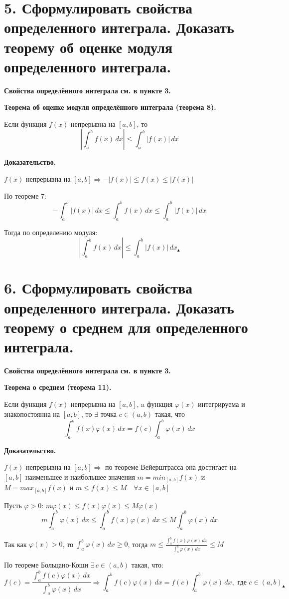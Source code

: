 \documentclass[11pt]{article}
\begin{document}
\section*{5. Сформулировать свойства определенного интеграла. Доказать теорему об оценке модуля определенного интеграла.}
\par\textbf{Свойства определённого интеграла см. в пункте 3.}
\par\textbf{Теорема об оценке модуля определённого интеграла (теорема 8).}
\par Если функция $f(x)$ непрерывна на $[a, b]$, то $$\left| \int_{a}^b f(x) \, dx \right| \leq \int_{a}^b |f(x)| \, dx$$
\par\textbf{Доказательство.}
\par $f(x)$ непрерывна на $[a, b] \Rightarrow -|f(x)| \leq f(x) \leq |f(x)|$
\par По теореме 7: $$- \int_{a}^b |f(x)| \, dx \leq \int_{a}^b f(x) \, dx \leq \int_{a}^b |f(x)| \, dx$$
\par Тогда по определению модуля: $$\left| \int_{a}^b f(x) \, dx \right| \leq \int_{a}^b |f(x)| \, dx _{\blacktriangle}$$

\section*{6. Сформулировать свойства определенного интеграла. Доказать теорему о среднем для определенного интеграла.}
\par\textbf{Свойства определённого интеграла см. в пункте 3.}
\par\textbf{Теорема о среднем (теорема 11).}
\par Если функция $f(x)$ непрерывна на $[a, b]$, a функция $\varphi(x)$ интегрируема и знакопостоянна на $[a, b]$, то $\exists$ точка $c \in (a, b)$ такая, что $$\int_{a}^b f(x)\varphi(x) \, dx = f(c) \int_{a}^b \varphi(x) \, dx$$
\par\textbf{Доказательство.}
\par $f(x)$ непрерывна на $[a, b] \Rightarrow$ по теореме Вейерштрасса она достигает на  $[a, b]$ наименьшее и наибольшее значения $m = min_{[a, b]} f(x)$ и $M = max_{[a, b]} f(x)$ и $m \leq f(x) \leq M \quad \forall x \in [a, b]$
\par Пусть $\varphi > 0$:
$m \varphi(x) \leq f(x) \varphi(x) \leq M \varphi(x)$
$$m \int_{a}^b \varphi(x) \, dx  \leq \int_{a}^b f(x) \varphi(x) \, dx \leq M \int_{a}^b \varphi(x) \, dx$$
\par Так как $\varphi(x) > 0$, то $\int_{a}^b \varphi(x) \, dx \geq 0$, тогда $m \leq  \frac{{\int_{a}^b f(x) \varphi(x) \, dx}}{\int_{a}^b \varphi(x) \, dx} \leq M$
\par По теореме Больцано-Коши $\exists \, c \in (a, b)$ такая, что: $$f(c) = \frac{{\int_{a}^b f(c) \varphi(x) \, dx}}{\int_{a}^b \varphi(x) \, dx} \Rightarrow \int_{a}^b f(c) \varphi(x) \, dx = f(c) \int_{a}^b \varphi(x) \, dx, \text{ где } c \in (a, b) _{\blacktriangle}$$
\end{document}
